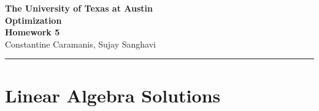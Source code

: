\documentclass{article}
\begin{document}
\begin{center}
    \large\textbf{The University of Texas at Austin}\\[0.5em]
    \Large\textbf{Optimization}\\[1em]
    \large\textbf{Homework 5}\\[1em]
    Constantine Caramanis, Sujay Sanghavi\\[0.5em]
\end{center}

\hrule

\vspace{1em}  %

\section{Linear Algebra Solutions}
\end{document}
